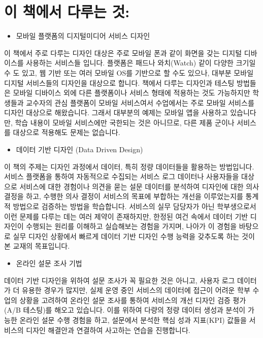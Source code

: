 \documentclass[
  letterpaper,
]{book}
\providecommand{\tightlist}{%
  \setlength{\itemsep}{0pt}\setlength{\parskip}{0pt}}\usepackage{longtable,booktabs,array}
\begin{document}
\section{이 책에서 다루는
것:}\label{uxc774-uxcc45uxc5d0uxc11c-uxb2e4uxb8e8uxb294-uxac83}

\begin{itemize}
\tightlist
\item
  모바일 플랫폼의 디지털미디어 서비스 디자인
\end{itemize}

이 책에서 주로 다루는 디자인 대상은 주로 모바일 폰과 같이 화면을 갖는
디지털 디바이스를 사용하는 서비스들 입니다. 플랫폼은 패드나 와치(Watch)
같이 다양한 크기일 수 도 있고, 웹 기반 또는 여러 모바일 OS를 기반으로 할
수도 있으나, 대부분 모바일 디지털 서비스들의 디자인을 대상으로 합니다.
책에서 다루는 디자인과 테스팅 방법들은 모바일 디바이스 외에 다른
플랫폼이나 서비스 형태에 적용하는 것도 가능하지만 학생들과 교수자의 관심
플랫폼이 모바일 서비스여서 수업에서는 주로 모바일 서비스를 디자인
대상으로 해왔습니다. 그래서 대부분의 예제는 모바일 앱을 사용하고
있습니다만, 학습 내용이 모바일 서비스에만 국한되는 것은 아니므로, 다른
제품 군이나 서비스를 대상으로 적용해도 문제는 없습니다.

\begin{itemize}
\tightlist
\item
  데이터 기반 디자인 (Data Driven Design)
\end{itemize}

이 책의 주제는 디자인 과정에서 데이터, 특히 정량 데이터들을 활용하는
방법입니다. 서비스 플랫폼을 통하여 자동적으로 수집되는 서비스 로그
데이터나 사용자들을 대상으로 서비스에 대한 경험이나 의견을 묻는 설문
데이터를 분석하여 디자인에 대한 의사 결정을 하고, 수행한 의사 결정이
서비스의 목표에 부합하는 개선을 이루었는지를 통계적 방법으로 검증하는
방법을 학습합니다. 서비스의 실무 담당자가 아닌 학부생으로서 이런 문제를
다루는 데는 여러 제약이 존재하지만, 한정된 여건 속에서 데이터 기반
디자인이 수행되는 원리를 이해하고 실습해보는 경험을 가지며, 나아가 이
경험을 바탕으로 실무 디자인 상황에서 빠르게 데이터 기반 디자인 수행
능력을 갖추도록 하는 것이 본 교재의 목표입니다.

\begin{itemize}
\tightlist
\item
  온라인 설문 조사 기법
\end{itemize}

데이터 기반 디자인을 위하여 설문 조사가 꼭 필요한 것은 아니고, 사용자
로그 데이터가 더 유용한 경우가 많지만, 실제 운영 중인 서비스의 데이터에
접근이 어려운 학부 수업의 상황을 고려하여 온라인 설문 조사를 통하여
서비스의 개선 디자인 검증 평가(A/B 테스팅)를 해오고 있습니다. 이를
위하여 다량의 정량 데이터 생성과 분석이 가능한 온라인 설문 수행 경험을
하고, 설문에서 분석한 핵심 성과 지표(KPI) 값들을 서비스의 디자인
해결안과 연결하여 사고하는 연습을 진행합니다.
\end{document}
